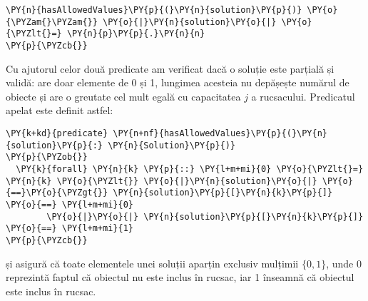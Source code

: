 \begin{sloppypar}
\begin{Verbatim}[commandchars=\\\{\}]
  \PY{n}{hasAllowedValues}\PY{p}{(}\PY{n}{solution}\PY{p}{)} \PY{o}{\PYZam{}\PYZam{}} \PY{o}{|}\PY{n}{solution}\PY{o}{|} \PY{o}{\PYZlt{}=} \PY{n}{p}\PY{p}{.}\PY{n}{n}
\PY{p}{\PYZcb{}}
\end{Verbatim}
\par Cu ajutorul celor două predicate am verificat dacă o soluție este parțială și validă: are doar elemente de 0 și 1, lungimea acesteia nu depășește numărul de obiecte și are o greutate cel mult egală cu capacitatea $j$ a rucsacului. Predicatul apelat  este definit astfel:
    \begin{Verbatim}[commandchars=\\\{\}]
\PY{k+kd}{predicate} \PY{n+nf}{hasAllowedValues}\PY{p}{(}\PY{n}{solution}\PY{p}{:} \PY{n}{Solution}\PY{p}{)}
\PY{p}{\PYZob{}}
  \PY{k}{forall} \PY{n}{k} \PY{p}{::} \PY{l+m+mi}{0} \PY{o}{\PYZlt{}=} \PY{n}{k} \PY{o}{\PYZlt{}} \PY{o}{|}\PY{n}{solution}\PY{o}{|} \PY{o}{==}\PY{o}{\PYZgt{}} \PY{n}{solution}\PY{p}{[}\PY{n}{k}\PY{p}{]} \PY{o}{==} \PY{l+m+mi}{0} 
        \PY{o}{|}\PY{o}{|} \PY{n}{solution}\PY{p}{[}\PY{n}{k}\PY{p}{]} \PY{o}{==} \PY{l+m+mi}{1}
\PY{p}{\PYZcb{}}
\end{Verbatim}
    și asigură că toate elementele unei soluții aparțin exclusiv mulțimii $\{0, 1\}$, unde 0 reprezintă faptul că obiectul nu este inclus în rucsac, iar 1 înseamnă că obiectul este inclus în rucsac.


\end{sloppypar}
